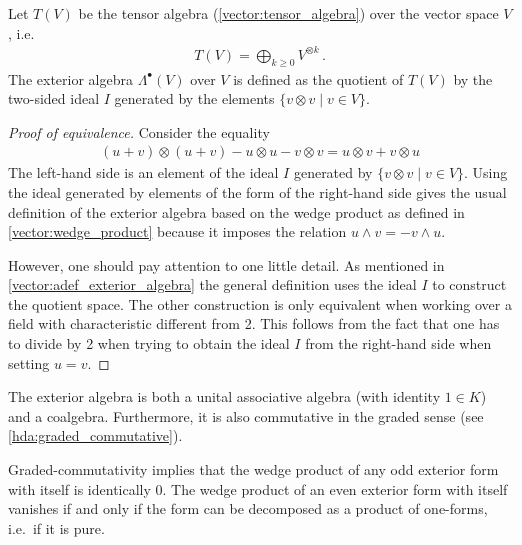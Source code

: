     \begin{adefinition}\label{vector:adef_exterior_algebra}
        Let $T(V)$ be the tensor algebra (\cref{vector:tensor_algebra}) over the vector space $V$, i.e.
        \begin{gather}
            T(V) = \bigoplus_{k\geq0}V^{\otimes k}\,.
        \end{gather}
        The exterior algebra $\Lambda^\bullet(V)$ over $V$ is defined as the quotient of $T(V)$ by the two-sided ideal $I$ generated by the elements $\{v\otimes v\mid v\in V\}$.
        \begin{mdframed}[roundcorner=10pt, linecolor=blue, linewidth=1pt]
            \begin{proof}[Proof of equivalence]
                Consider the equality
                \begin{gather*}
                    (u+v)\otimes(u+v) - u\otimes u - v\otimes v = u\otimes v + v\otimes u
                \end{gather*}
                The left-hand side is an element of the ideal $I$ generated by $\{v\otimes v\mid v\in V\}$. Using the ideal generated by elements of the form of the right-hand side gives the usual definition of the exterior algebra based on the wedge product as defined in \cref{vector:wedge_product} because it imposes the relation $u\wedge v = -v\wedge u$.

                However, one should pay attention to one little detail. As mentioned in \cref{vector:adef_exterior_algebra} the general definition uses the ideal $I$ to construct the quotient space. The other construction is only equivalent when working over a field with characteristic different from 2. This follows from the fact that one has to divide by 2 when trying to obtain the ideal $I$ from the right-hand side when setting $u=v$.
            \end{proof}
        \end{mdframed}
    \end{adefinition}

    \begin{property}
        The exterior algebra is both a unital associative algebra (with identity $1\in K$) and a coalgebra. Furthermore, it is also commutative in the graded sense (see \cref{hda:graded_commutative}).
    \end{property}

    \begin{property}[Nilpotency]
        Graded-commutativity implies that the wedge product of any odd exterior form with itself is identically 0. The wedge product of an even exterior form with itself vanishes if and only if the form can be decomposed as a product of one-forms, i.e.~if it is pure.
    \end{property}

